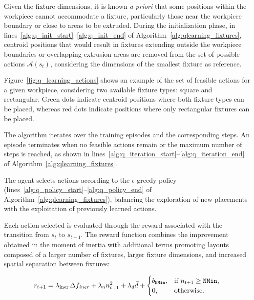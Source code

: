 Given the fixture dimensions, it is known \emph{a priori} that some positions within the workpiece cannot accommodate a fixture, particularly those near the workpiece boundary or close to areas to be extruded. During the initialization phase, in lines~\ref{alg:q_init_start}--\ref{alg:q_init_end} of Algorithm~\ref{alg:qlearning_fixtures}, centroid positions that would result in fixtures extending outside the workpiece boundaries or overlapping extrusion areas are removed from the set of possible actions \(\mathcal{A}(s_t)\), considering the dimensions of the smallest fixture as reference.

Figure~\ref{fig:q_learning_actions} shows an example of the set of feasible actions for a given workpiece, considering two available fixture types: square and rectangular. Green dots indicate centroid positions where both fixture types can be placed, whereas red dots indicate positions where only rectangular fixtures can be placed.

The algorithm iterates over the training episodes and the corresponding steps. An episode terminates when no feasible actions remain or the maximum number of steps is reached, as shown in lines~\ref{alg:q_iteration_start}--\ref{alg:q_iteration_end} of Algorithm~\ref{alg:qlearning_fixtures}.

The agent selects actions according to the \(\epsilon\)-greedy policy (lines~\ref{alg:q_policy_start}--\ref{alg:q_policy_end} of Algorithm~\ref{alg:qlearning_fixtures}), balancing the exploration of new placements with the exploitation of previously learned actions.

Each action selected is evaluated through the reward associated with the transition from \(s_t\) to \(s_{t+1}\). The reward function combines the improvement obtained in the moment of inertia with additional terms promoting layouts composed of a larger number of fixtures, larger fixture dimensions, and increased spatial separation between fixtures:

\begin{equation}
	r_{t+1}
	=
	\lambda_{\mathrm{iner}}\,\Delta f_\mathit{iner}
	+
	\lambda_n n_{t+1}^{2}
	+
	\lambda_d\bar d
	+
	\begin{cases}
		b_{\mathtt{NMin}}, & \text{if } n_{t+1}\geq\mathtt{NMin},\\
		0, & \text{otherwise}.
	\end{cases}
	\label{eq:reward}
\end{equation}

